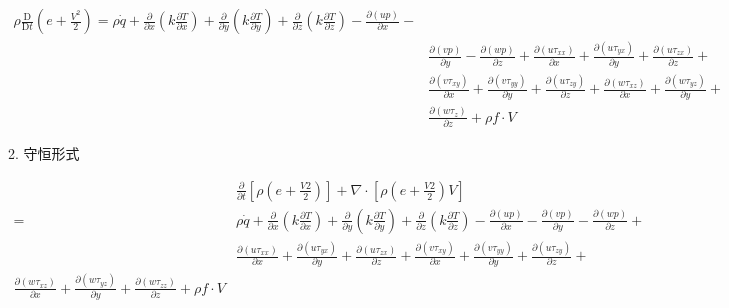 $$
	\begin{gathered}
		\rho \frac{\mathrm{D}}{\mathrm{D} t}\left(e+\frac{V^{2}}{2}\right)=\rho \dot{q}+\frac{\partial}{\partial x}\left(k \frac{\partial T}{\partial x}\right)+\frac{\partial}{\partial y}\left(k \frac{\partial T}{\partial y}\right)+\frac{\partial}{\partial z}\left(k \frac{\partial T}{\partial z}\right)-\frac{\partial(u p)}{\partial x}- \\
		& \frac{\partial(v p)}{\partial y}-\frac{\partial(w p)}{\partial z}+\frac{\partial\left(u \tau_{x x}\right)}{\partial x}+\frac{\partial\left(u \tau_{y x}\right)}{\partial y}+\frac{\partial\left(u \tau_{z x}\right)}{\partial z}+ \\
		& \frac{\partial\left(v \tau_{x y}\right)}{\partial x}+\frac{\partial\left(v \tau_{y y}\right)}{\partial y}+\frac{\partial\left(u \tau_{z y}\right)}{\partial z}+\frac{\partial\left(w \tau_{x z}\right)}{\partial x}+\frac{\partial\left(w \tau_{y z}\right)}{\partial y}+ \\
		& \frac{\partial\left(w \tau_{z}\right)}{\partial z}+\rho f \cdot V
	\end{gathered}
$$

2. 守恒形式

$$
	\begin{aligned}
		  & \frac{\partial}{\partial t}\left[\rho\left(e+\frac{V 2}{2}\right)\right]+\nabla \cdot\left[\rho\left(e+\frac{V 2}{2}\right) V\right]                                                                                                                                                                                                     \\
		= & \rho \dot{q}+\frac{\partial}{\partial x}\left(k \frac{\partial T}{\partial x}\right)+\frac{\partial}{\partial y}\left(k \frac{\partial T}{\partial y}\right)+\frac{\partial}{\partial z}\left(k \frac{\partial T}{\partial z}\right)-\frac{\partial(u p)}{\partial x}-\frac{\partial(v p)}{\partial y}-\frac{\partial(w p)}{\partial z}+ \\
		  & \frac{\partial\left(u \tau_{x x}\right)}{\partial x}+\frac{\partial\left(u \tau_{y x}\right)}{\partial y}+\frac{\partial\left(u \tau_{z x}\right)}{\partial z}+\frac{\partial\left(v \tau_{x y}\right)}{\partial x}+\frac{\partial\left(v \tau_{y y}\right)}{\partial y}+\frac{\partial\left(u \tau_{z y}\right)}{\partial z}+           \\
		\frac{\partial\left(w \tau_{x z}\right)}{\partial x}+\frac{\partial\left(w \tau_{y z}\right)}{\partial y}+\frac{\partial\left(w \tau_{z z}\right)}{\partial z}+\rho f \cdot V
	\end{aligned}
$$

